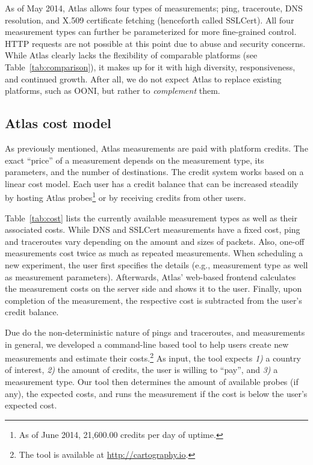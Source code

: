 As of May 2014, Atlas allows four types of measurements; ping, traceroute, DNS
resolution, and X.509 certificate fetching (henceforth called SSLCert).  All
four measurement types can further be parameterized for more fine-grained
control.  HTTP requests are not possible at this point due to abuse and
security concerns.  While Atlas clearly lacks the flexibility of comparable
platforms (see Table~\ref{tab:comparison}), it makes up for it with high
diversity, responsiveness, and continued growth.  After all, we do not expect
Atlas to replace existing platforms, such as OONI, but rather to
\emph{complement} them.


\subsection{Atlas cost model}

As previously mentioned, Atlas measurements are paid with platform
credits.  The exact ``price'' of a measurement depends on the measurement type,
its parameters, and the number of destinations.  The credit system works based on a
linear cost model.  Each user has a credit balance that can be increased
steadily by hosting Atlas probes\footnote{As of June 2014, 21,600.00 credits per day of uptime.} or by receiving credits from other users.

Table~\ref{tab:cost} lists the currently available measurement types as well as
their associated costs.  While DNS and SSLCert measurements have a fixed cost,
ping and traceroutes vary depending on the amount and sizes of packets.  Also,
one-off measurements cost twice as much as repeated measurements.  When
scheduling a new experiment, the user first specifies the details (e.g.,
measurement type as well as measurement parameters).  Afterwards, Atlas'
web-based frontend calculates the measurement costs on the server side and
shows it to the user.  Finally, upon completion of the measurement, the
respective cost is subtracted from the user's credit balance.

Due do the non-deterministic nature of pings and traceroutes, and measurements
in general, we developed a command-line based tool to help users create new
measurements and estimate their costs.\footnote{The tool is available at
\url{http://cartography.io}.}  As input, the tool expects \emph{1)}
a country of interest, \emph{2)} the amount of credits, the user is willing
to ``pay'', and \emph{3)} a measurement type.  Our tool then determines the
amount of available probes (if any), the expected costs, and runs the
measurement if the cost is below the user's expected cost.

